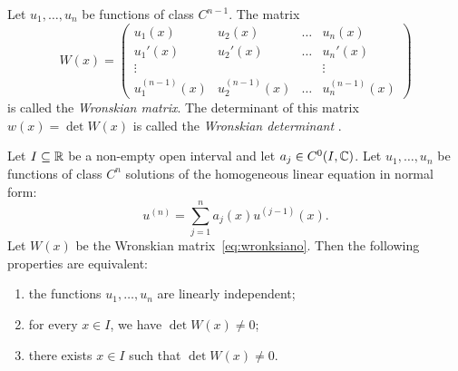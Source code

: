 \begin{definition}[Wronskian]
Let $u_1, \dots, u_n$ be functions of class $C^{n-1}$.
The matrix
\begin{equation}\label{eq:wronksiano}
  W(x) =
    \begin{pmatrix}
    u_1(x) & u_2(x) & \dots & u_n(x) \\
    u_1'(x) & u_2'(x) & \dots & u_n'(x) \\
    \vdots & & & \vdots\\
    u_1^{(n-1)}(x) & u_2^{(n-1)}(x) & \dots & u_n^{(n-1)}(x)
    \end{pmatrix}
\end{equation}
is called the \emph{Wronskian matrix}.
%
%
%
%
The determinant of this matrix
$w(x) = \det W(x)$ is called the
\emph{Wronskian determinant}%
.
\end{definition}

\begin{theorem}%
\label{th:wronksiano}%
Let $I\subseteq {\mathbb R}$ be a non-empty open interval and let $a_j\in C^0(I,{\mathbb C})$.
Let $u_1, \dots, u_n$ be functions of class $C^n$ solutions
of the homogeneous linear equation in normal form:
\begin{equation}\label{eq:092784}
  u^{(n)} = \sum_{j=1}^n a_j(x) u^{(j-1)}(x).
\end{equation}
Let $W(x)$ be the Wronskian matrix~\eqref{eq:wronksiano}.
Then the following properties are equivalent:
\begin{enumerate}
\item \label{item:4736201} the functions $u_1,\dots, u_n$ are linearly independent;
\item \label{item:4736202} for every $x\in I$, we have $\det W(x)\neq 0$;
\item \label{item:4736203} there exists $x\in I$ such that $\det W(x)\neq 0$.
\end{enumerate}
\end{theorem}

